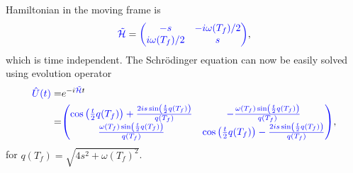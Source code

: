 Hamiltonian in the moving frame is
\begin{equation}
    \textcolor{blue}{\tilde{\mathcal{H}}}=\textcolor{blue}{\begin{pmatrix}
        -s&-i\omega(T_f)/2\\
        i\omega(T_f)/2&s
    \end{pmatrix}},
\end{equation}
which is time independent. The Schr\"odinger equation can now be easily solved using evolution operator
\begin{equation}
    \begin{split}
        \textcolor{blue}{\hat U(t)}=&e^{-i\textcolor{blue}{\tilde{\mathcal{H}}}t}\\
        =&\textcolor{blue}{\begin{pmatrix}
            \cos \left(\frac{t}{2} q(T_f)\right)+\frac{2 i s \sin \left(\frac{t}{2} q(T_f)\right)}{q(T_f)} & -\frac{\omega(T_f)  \sin \left(\frac{t}{2} q(T_f)\right)}{q(T_f)} \\
            \frac{\omega(T_f)  \sin \left(\frac{t}{2} q(T_f)\right)}{q(T_f)} & \cos \left(\frac{t}{2} q(T_f)\right)-\frac{2 i s \sin \left(\frac{t}{2} q(T_f)\right)}{q(T_f)} \\
        \end{pmatrix}},
    \end{split}
\end{equation}
for $q(T_f)=\sqrt{4 s^2+\omega(T_f) ^2}$.

